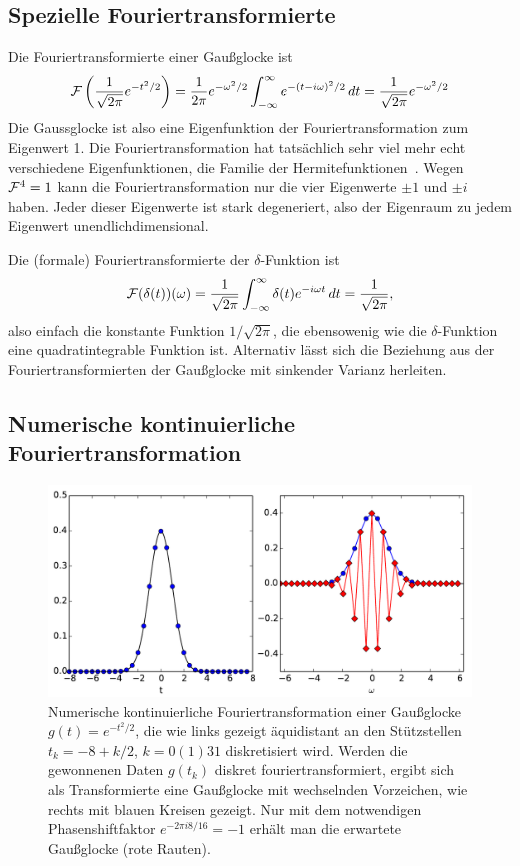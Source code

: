 \subsection{Spezielle Fouriertransformierte}

Die Fouriertransformierte einer Gaußglocke ist
\begin{equation}
  \mathcal F\left(\frac{1}{\sqrt{2\pi}}e^{-t^2/2}\right)
  =
  \frac{1}{2\pi}e^{-\omega^2/2}\int_{-\infty}^{\infty} e^{-(t-i\omega)^2/2}\, dt
  =
  \frac{1}{\sqrt{2\pi}}e^{-\omega^2/2}
\end{equation}
Die Gaussglocke ist also eine Eigenfunktion der Fouriertransformation
zum Eigenwert 1. Die Fouriertransformation hat tatsächlich sehr viel
mehr echt verschiedene Eigenfunktionen, die Familie der
Hermitefunktionen~\cite{pinsky02a}. Wegen $\mathcal F^4=1$ kann die
Fouriertransformation nur die vier Eigenwerte $\pm 1$ und $\pm i$
haben. Jeder dieser Eigenwerte ist stark degeneriert, also der
Eigenraum zu jedem Eigenwert unendlichdimensional.

Die (formale) Fouriertransformierte der $\delta$-Funktion ist
\begin{equation}
  \label{eq:fourierdelta}
  \mathcal F(\delta(t))(\omega)
  =
  \frac{1}{\sqrt{2\pi}}\int_{-\infty}^{\infty}
  \delta(t)e^{-i \omega t}\, dt = \frac{1}{\sqrt{2\pi}},
\end{equation}
also einfach die konstante Funktion $1/\sqrt{2\pi}$, die ebensowenig
wie die $\delta$-Funktion eine quadratintegrable Funktion
ist. Alternativ lässt sich die Beziehung aus der
Fouriertransformierten der Gaußglocke mit sinkender Varianz herleiten.

\subsection{Numerische kontinuierliche Fouriertransformation}
\label{sec:contdft}

\begin{figure}
  \centering
  \includegraphics[width=\textwidth]{plots/dft}
  \caption{Numerische kontinuierliche Fouriertransformation einer
  Gaußglocke $g(t) = e^{-t^2/2}$, die wie links gezeigt äquidistant
  an den Stützstellen $t_k=-8 + k/2$, $k=0(1)31$ diskretisiert wird.
  Werden die gewonnenen Daten $g(t_k)$ diskret fouriertransformiert,
  ergibt sich als Transformierte eine Gaußglocke mit wechselnden
  Vorzeichen, wie rechts mit blauen Kreisen gezeigt. Nur mit dem
  notwendigen Phasenshiftfaktor $e^{-2\pi i 8/16}=-1$ erhält man die
  erwartete Gaußglocke (rote Rauten).}
  \label{fig:contdft}
\end{figure}

